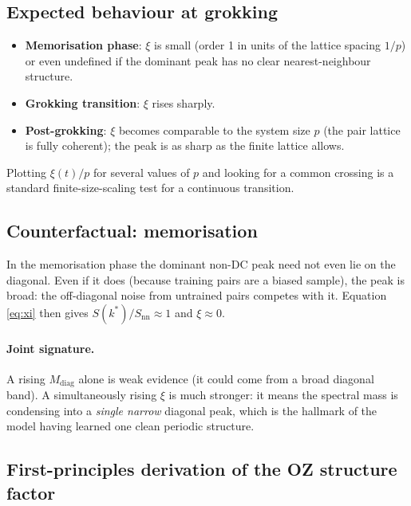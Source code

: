\documentclass[11pt]{article}
\newcommand{\diag}{\mathrm{diag}}
\begin{document}
\subsection{Expected behaviour at grokking}

\begin{itemize}
    \item \textbf{Memorisation phase}: $\xi$ is small (order 1 in units of
    the lattice spacing $1/p$) or even undefined if the dominant peak has no
    clear nearest-neighbour structure.
    \item \textbf{Grokking transition}: $\xi$ rises sharply.
    \item \textbf{Post-grokking}: $\xi$ becomes comparable to the system size
    $p$ (the pair lattice is fully coherent); the peak is as sharp as the
    finite lattice allows.
\end{itemize}
Plotting $\xi(t)/p$ for several values of $p$ and looking for a common crossing
is a standard finite-size-scaling test for a continuous transition.

\subsection{Counterfactual: memorisation}

In the memorisation phase the dominant non-DC peak need not even lie on the
diagonal.
Even if it does (because training pairs are a biased sample), the peak is
broad: the off-diagonal noise from untrained pairs competes with it.
Equation \eqref{eq:xi} then gives $S(k^*)/S_{\mathrm{nn}}\approx 1$ and
$\xi\approx 0$.

\paragraph{Joint signature.}
A rising $M_{\diag}$ alone is weak evidence (it could come from a broad
diagonal band).
A simultaneously rising $\xi$ is much stronger: it means the spectral mass
is condensing into a \emph{single narrow} diagonal peak, which is the
hallmark of the model having learned one clean periodic structure.

\subsection{First-principles derivation of the OZ structure factor}
\label{sec:oz-deriv}
\end{document}

